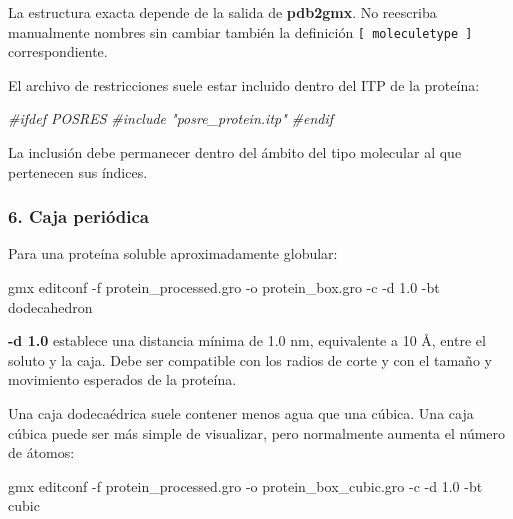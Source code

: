 \documentclass[
  spanish,
  11pt,
  a4paper]{article}
\newenvironment{Shaded}{\begin{snugshade}}{\end{snugshade}}
\newcommand{\AttributeTok}[1]{\textcolor[rgb]{0.13,0.29,0.53}{#1}}
\newcommand{\CommentTok}[1]{\textcolor[rgb]{0.56,0.35,0.01}{\textit{#1}}}
\newcommand{\ExtensionTok}[1]{#1}
\newcommand{\NormalTok}[1]{#1}
\begin{document}
La estructura exacta depende de la salida de \textbf{pdb2gmx}. No
reescriba manualmente nombres sin cambiar también la definición
\texttt{{[}\ moleculetype\ {]}} correspondiente.

El archivo de restricciones suele estar incluido dentro del ITP de la
proteína:

\begin{Shaded}
\begin{Highlighting}[]
\CommentTok{\#ifdef POSRES}
\CommentTok{\#include "posre\_protein.itp"}
\CommentTok{\#endif}
\end{Highlighting}
\end{Shaded}

La inclusión debe permanecer dentro del ámbito del tipo molecular al que
pertenecen sus índices.

\subsubsection{6. Caja periódica}\label{caja-periuxf3dica-1}

Para una proteína soluble aproximadamente globular:

\begin{Shaded}
\begin{Highlighting}[]
\ExtensionTok{gmx}\NormalTok{ editconf     }\AttributeTok{{-}f}\NormalTok{ protein\_processed.gro     }\AttributeTok{{-}o}\NormalTok{ protein\_box.gro     }\AttributeTok{{-}c}     \AttributeTok{{-}d}\NormalTok{ 1.0     }\AttributeTok{{-}bt}\NormalTok{ dodecahedron}
\end{Highlighting}
\end{Shaded}

\textbf{-d 1.0} establece una distancia mínima de 1.0 nm, equivalente a
10 Å, entre el soluto y la caja. Debe ser compatible con los radios de
corte y con el tamaño y movimiento esperados de la proteína.

Una caja dodecaédrica suele contener menos agua que una cúbica. Una caja
cúbica puede ser más simple de visualizar, pero normalmente aumenta el
número de átomos:

\begin{Shaded}
\begin{Highlighting}[]
\ExtensionTok{gmx}\NormalTok{ editconf     }\AttributeTok{{-}f}\NormalTok{ protein\_processed.gro     }\AttributeTok{{-}o}\NormalTok{ protein\_box\_cubic.gro     }\AttributeTok{{-}c}     \AttributeTok{{-}d}\NormalTok{ 1.0     }\AttributeTok{{-}bt}\NormalTok{ cubic}
\end{Highlighting}
\end{Shaded}
\end{document}
